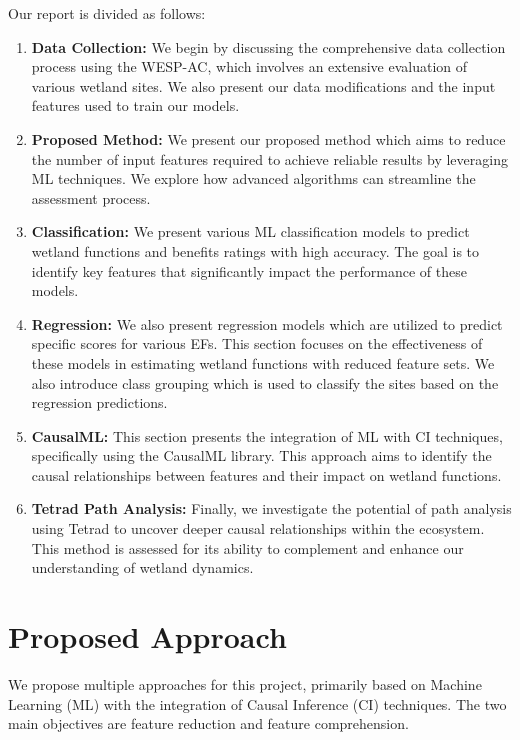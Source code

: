 \documentclass[12pt,letterpaper]{article}
\begin{document}
Our report is divided as follows:
\begin{enumerate}
    \item \textbf{Data Collection:} 
    We begin by discussing the comprehensive data collection process using the \ac{WESP-AC}, which involves an extensive evaluation of various wetland sites.
    We also present our data modifications and the input features used to train our models.
    
    \item \textbf{Proposed Method:} 
    We present our proposed method which aims to reduce the number of input features required to achieve reliable results by leveraging \ac{ML} techniques. We explore how advanced algorithms can streamline the assessment process.

    \item \textbf{Classification:} 
    We present various \ac{ML} classification models to predict wetland functions and benefits ratings with high accuracy.
    The goal is to identify key features that significantly impact the performance of these models.

    \item \textbf{Regression:} 
    We also present regression models which are utilized to predict specific scores for various \acp{EF}.
    This section focuses on the effectiveness of these models in estimating wetland functions with reduced feature sets.
    We also introduce class grouping which is used to classify the sites based on the regression predictions.

    \item \textbf{CausalML:} 
    This section presents the integration of \ac{ML} with \ac{CI} techniques, specifically using the CausalML library.
    This approach aims to identify the causal relationships between features and their impact on wetland functions.

    \item \textbf{Tetrad Path Analysis:} 
    Finally, we investigate the potential of path analysis using Tetrad to uncover deeper causal relationships within the ecosystem. This method is assessed for its ability to complement and enhance our understanding of wetland dynamics.
\end{enumerate}



\section{Proposed Approach}\label{sec:PA}
We propose multiple approaches for this project, primarily based on Machine Learning (\ac{ML}) with the integration of Causal Inference (\ac{CI}) techniques.
The two main objectives are feature reduction and feature comprehension.
\end{document}

